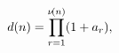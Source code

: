 \[\mathop{d\/}\nolimits\!\left(n\right)=\prod_{r=1}^{\mathop{\nu\/}\nolimits\!%
\left(n\right)}(1+a_{r}),\]